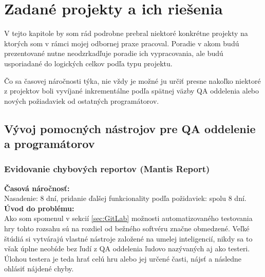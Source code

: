 \documentclass[slovak, bachelorpractice]{diploma}
\begin{document}
\chapter{Zadané projekty a ich riešenia}
\label{sec:Projects}
V tejto kapitole by som rád podrobne prebral niektoré konkrétne projekty na ktorých som v rámci mojej odbornej praxe pracoval. Poradie v akom budú prezentované nutne neodzrkadľuje poradie ich vypracovania, ale budú usporiadané do logických celkov podľa typu projektu. 

Čo sa časovej náročnosti týka, nie vždy je možné ju určiť presne nakoľko niektoré z projektov boli vyvíjané inkrementálne podľa spätnej väzby QA oddelenia alebo nových požiadaviek od ostatných programátorov.

\section{Vývoj pomocných nástrojov pre QA oddelenie a programátorov}
\label{sec:QACode}
\subsection{Evidovanie chybových reportov (Mantis Report)}
\label{sec:Report}
\textbf{Časová náročnosť:} \\ Nasadenie: 8 dní, pridanie ďalšej funkcionality podľa požidaviek: spolu 8 dní.\\
\textbf{Úvod do problému:} \\ Ako som spomenul v sekcií \ref{sec:GitLab} možnosti automatizovaného testovania hry tohto rozsahu sú na rozdiel od bežného softvéru značne obmedzené. Veľké štúdiá si vytvárajú vlastné nástroje založené na umelej inteligencií, nikdy sa to však úplne neobíde bez ľudí z QA oddelenia ľudovo nazývaných aj ako testeri. Úlohou testera je teda hrať celú hru alebo jej určené časti, nájsť a následne ohlásiť nájdené chyby. 
\end{document}
